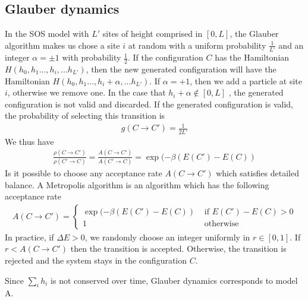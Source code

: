 \subsection{Glauber dynamics}

In the SOS model with $L'$ sites of height comprised in $[0,L]$, the Glauber algorithm \cite{glauber_timedependent_1963} makes us chose a site $i$ at random with a uniform probability $\frac{1}{L'}$ and an integer $\alpha = \pm 1$ with probability $\frac{1}{2}$. If the configuration $C$ has the Hamiltonian $H(h_0,h_1...,h_i,...h_{L'})$, then the new generated configuration will have the Hamiltonian $H(h_0,h_1...,h_i+\alpha,...h_{L'})$.
If $\alpha=+1$, then we add a particle at site $i$, otherwise we remove one. In the case that $h_i+\alpha \not\in [0,L]$ , the generated configuration is not valid and discarded.
If the generated configuration is valid, the probability of selecting this transition is
\begin{align}
g(C\to C') = \frac{1}{2L'}
\end{align}
We thus have
\begin{align}
\frac{\rho(C\to C')}{\rho(C' \to C)} = \frac{A(C\to C')}{A(C'\to C)} = \exp(-\beta (E(C')-E(C))
\end{align}
Is it possible to choose any acceptance rate $A(C\to C')$ which satisfies detailed balance. A Metropolis algorithm is an algorithm which has the following acceptance rate
\begin{align}
A(C\to C') = \begin{cases} \exp(-\beta (E(C')-E(C)) &\text{ if } E(C')-E(C) \greater 0 \\
1 &\text{ otherwise} \end{cases}
\label{taux-transition-metropolis}
\end{align}
In practice, if $\Delta E \greater 0$, we randomly choose an integer uniformly in $r\in[0,1]$. If $r\less A(C\to C') $ then the transition is accepted. Otherwise, the transition is rejected and the system stays in the configuration $C$.

Since $\sum_i h_i$ is not conserved over time, Glauber dynamics corresponds to model A.

